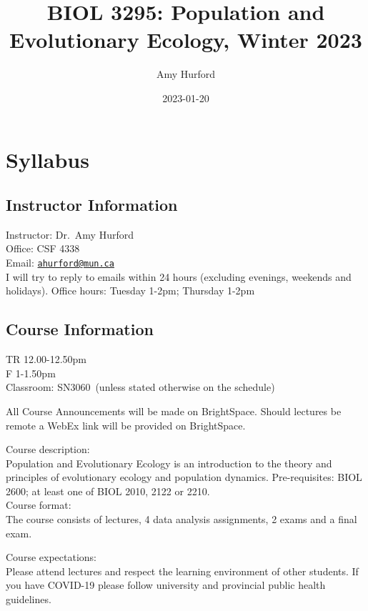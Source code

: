 \documentclass[
]{book}
\title{BIOL 3295: Population and Evolutionary Ecology, Winter 2023}
\author{Amy Hurford}
\date{2023-01-20}
\begin{document}
\maketitle

{
\setcounter{tocdepth}{1}
\tableofcontents
}
\hypertarget{syllabus}{%
\chapter{Syllabus}\label{syllabus}}

\hypertarget{instructor-information}{%
\section{Instructor Information}\label{instructor-information}}

Instructor: Dr.~Amy Hurford\\
Office: CSF 4338\\
Email: \href{mailto:ahurford@mun.ca}{\nolinkurl{ahurford@mun.ca}}\\
I will try to reply to emails within 24 hours (excluding evenings, weekends and holidays).
Office hours: Tuesday 1-2pm; Thursday 1-2pm

\hypertarget{course-information}{%
\section{Course Information}\label{course-information}}

TR 12.00-12.50pm\\
F 1-1.50pm\\
Classroom: SN3060~(unless stated otherwise on the schedule)

All Course Announcements will be made on BrightSpace. Should lectures be remote a WebEx link will be provided on BrightSpace.

Course description:\\
Population and Evolutionary Ecology is an introduction to the theory and principles of evolutionary ecology and population dynamics. Pre-requisites: BIOL 2600; at least one of BIOL 2010, 2122 or 2210.\\

Course format:\\
The course consists of lectures, 4 data analysis assignments, 2 exams and a final exam.~

Course expectations:\\
Please attend lectures and respect the learning environment of other students. If you have COVID-19 please follow university and provincial public health guidelines.\\
\end{document}
